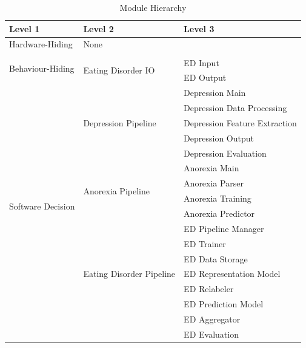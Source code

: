 \documentclass[12pt, titlepage]{article}
\begin{document}
\begin{table}[H]
\centering
\begin{tabular}{p{} p{} p{}}
\toprule
\textbf{Level 1} & \textbf{Level 2} & \textbf{Level 3}\\
\midrule

{Hardware-Hiding} & None \\
\midrule

\multirow{3}{*}{Behaviour-Hiding} & \\ \cline{2-3}
& \multirow{2}{*}{Eating Disorder IO} & ED Input\\
& & ED Output\\
\midrule

\multirow{16}{*}{Software Decision} 
& \multirow{5}{*}{Depression Pipeline} & Depression Main\\ 
& & Depression Data Processing\\
& & Depression Feature Extraction\\
& & Depression Output\\ 
& & Depression Evaluation\\\cline{2-3}
& \multirow{4}{*}{Anorexia Pipeline} & Anorexia Main\\ 
& & Anorexia Parser\\
& & Anorexia Training\\
& & Anorexia Predictor\\ \cline{2-3}
& \multirow{7}{*}{Eating Disorder Pipeline} & ED Pipeline Manager\\
& & ED Trainer\\
& & ED Data Storage\\
& & ED Representation Model\\
& & ED Relabeler\\
& & ED Prediction Model\\
& & ED Aggregator\\
& & ED Evaluation\\
\bottomrule

\end{tabular}
\caption{Module Hierarchy}
\label{TblMH}
\end{table} \newpage
\end{document}
